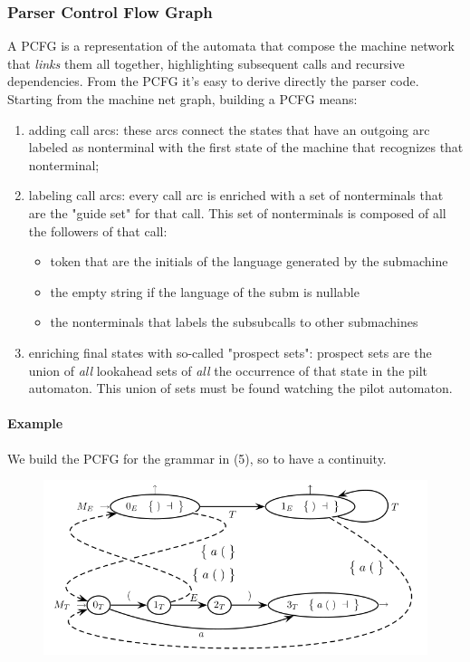 			\subsubsection{Parser Control Flow Graph}
				A PCFG is a representation of the automata that compose the machine network that \emph{links} them all together, highlighting subsequent calls and recursive dependencies. From the PCFG it's easy to derive directly the parser code.\\
				Starting from the machine net graph, building a PCFG means:
				\begin{enumerate}
					\item adding call arcs: these arcs connect the states that have an outgoing arc labeled as nonterminal with the first state of the machine that recognizes that nonterminal;
					\item labeling call arcs: every call arc is enriched with a set of nonterminals that are the "guide set" for that call. This set of nonterminals is composed of all the followers of that call:
						\begin{itemize}
							\item token that are the initials of the language generated by the submachine
							\item the empty string if the language of the subm is nullable
							\item the nonterminals that labels the subsubcalls to other submachines
						\end{itemize}
					\item enriching final states with so-called "prospect sets": prospect sets are the union of \emph{all} lookahead sets of \emph{all} the occurrence of that state in the pilt automaton. This union of sets must be found watching the pilot automaton. 
				\end{enumerate}
				
				\paragraph{Example}
					We build the PCFG for the grammar in (5), so to have a continuity.
					\begin{figure}[H]
						\centering
						\includegraphics[width = \textwidth]{./images/PCFG.png}
					\end{figure}
			 
